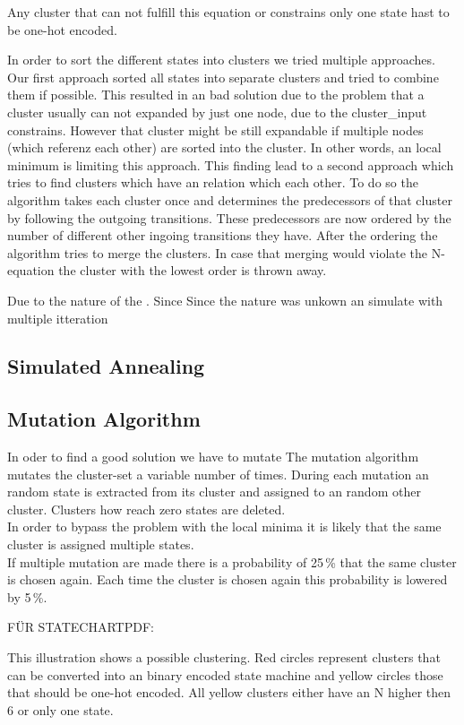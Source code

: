 Any cluster that can not fulfill this equation or constrains only one state hast to be one-hot encoded. 

In order to sort the different states into clusters we tried multiple approaches. Our first approach sorted all states into separate clusters and tried to combine them if possible. This resulted in an bad solution due to the problem that a cluster usually can not expanded by just one node, due to the cluster\_input constrains. However that cluster might be still expandable if multiple nodes (which referenz each other) are sorted into the cluster. In other words, an local minimum is limiting this approach.
This finding lead to a second approach which tries to find clusters which have an relation which each other. To do so the algorithm takes each cluster once and determines the predecessors of that cluster by following the outgoing transitions.
These predecessors are now ordered by the number of different other ingoing transitions they have. After the ordering the algorithm tries to merge the clusters. In case that merging would violate the N-equation the cluster with the lowest order is thrown away. 

Due to the nature of the . Since 
Since the nature was unkown an simulate with multiple itteration

\subsection{Simulated Annealing}
\label{subsubsec:format_clusters}


\subsection{Mutation Algorithm}
\label{subsubsec:format_clusters}

In oder to find a good solution we have to mutate
The mutation algorithm mutates the cluster-set a variable number of times.
During each mutation an random state is extracted from its cluster and assigned to an random other cluster. Clusters how reach zero states are deleted. \\
In order to bypass the problem with the local minima it is likely that the same cluster is assigned multiple states.\\
If multiple mutation are made there is a probability of 25\,\% that the same cluster is chosen again. Each time the cluster is chosen again this probability is lowered by 5\,\%.




FÜR STATECHARTPDF:

This illustration shows a possible clustering. Red circles represent clusters that can be converted into an binary encoded state machine and yellow circles those that should be one-hot encoded.
All yellow clusters either have an N higher then 6 or only one state.

